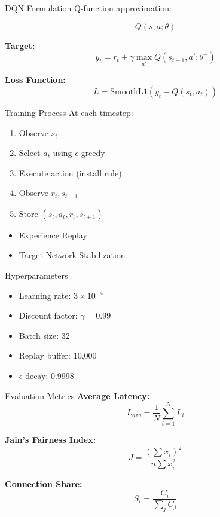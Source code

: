 \begin{frame}{DQN Formulation}
Q-function approximation:

\[
Q(s,a;\theta)
\]

\textbf{Target:}
\[
y_t = r_t + \gamma \max_{a'} Q(s_{t+1}, a'; \theta^-)
\]

\textbf{Loss Function:}
\[
L = \text{SmoothL1}(y_t - Q(s_t, a_t))
\]
\end{frame}

\begin{frame}{Training Process}
At each timestep:

\begin{enumerate}
    \item Observe $s_t$
    \item Select $a_t$ using $\epsilon$-greedy
    \item Execute action (install rule)
    \item Observe $r_t, s_{t+1}$
    \item Store $(s_t, a_t, r_t, s_{t+1})$
\end{enumerate}

\begin{itemize}
    \item Experience Replay
    \item Target Network Stabilization
\end{itemize}
\end{frame}

\begin{frame}{Hyperparameters}
\begin{itemize}
    \item Learning rate: $3 \times 10^{-4}$
    \item Discount factor: $\gamma = 0.99$
    \item Batch size: 32
    \item Replay buffer: 10,000
    \item $\epsilon$ decay: 0.9998
\end{itemize}
\end{frame}

\begin{frame}{Evaluation Metrics}
\textbf{Average Latency:}
\[
L_{avg} = \frac{1}{N} \sum_{i=1}^{N} L_i
\]

\textbf{Jain’s Fairness Index:}
\[
J = \frac{\left(\sum x_i\right)^2}{n \sum x_i^2}
\]

\textbf{Connection Share:}
\[
S_i = \frac{C_i}{\sum_j C_j}
\]
\end{frame}